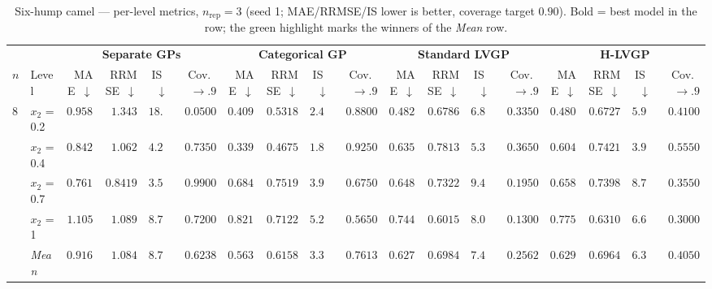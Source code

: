 \begin{table}[htbp]
\centering
\scriptsize
\setlength{\tabcolsep}{2.5pt}
\setlength{\fboxsep}{1pt}
\caption{Six-hump camel --- per-level metrics, $n_{\mathrm{rep}}=3$ (seed 1; MAE/RRMSE/IS lower is better, coverage target $0.90$). Bold = best model in the row; the green highlight marks the winners of the \emph{Mean} row.}
\label{tab:sixhump_camel_nrep03}
\begin{tabular}{llrrrrrrrrrrrrrrrr}
\toprule
 & & \multicolumn{4}{c}{\textbf{Separate GPs}} & \multicolumn{4}{c}{\textbf{Categorical GP}} & \multicolumn{4}{c}{\textbf{Standard LVGP}} & \multicolumn{4}{c}{\textbf{H-LVGP}} \\
\cmidrule(lr){3-6} \cmidrule(lr){7-10} \cmidrule(lr){11-14} \cmidrule(lr){15-18}
$n$ & Level & MAE~$\downarrow$ & RRMSE~$\downarrow$ & IS~$\downarrow$ & Cov.~$\to.9$ & MAE~$\downarrow$ & RRMSE~$\downarrow$ & IS~$\downarrow$ & Cov.~$\to.9$ & MAE~$\downarrow$ & RRMSE~$\downarrow$ & IS~$\downarrow$ & Cov.~$\to.9$ & MAE~$\downarrow$ & RRMSE~$\downarrow$ & IS~$\downarrow$ & Cov.~$\to.9$ \\
\midrule
\multirow{5}{*}{8} & $x_2$ = 0.2 & $0.9587$ & $1.343$ & $18.44$ & $0.0500$ & {\boldmath$0.4097$} & {\boldmath$0.5318$} & {\boldmath$2.431$} & {\boldmath$0.8800$} & $0.4820$ & $0.6786$ & $6.894$ & $0.3350$ & $0.4803$ & $0.6727$ & $5.995$ & $0.4100$ \\
 & $x_2$ = 0.4 & $0.8420$ & $1.062$ & $4.225$ & $0.7350$ & {\boldmath$0.3398$} & {\boldmath$0.4675$} & {\boldmath$1.828$} & {\boldmath$0.9250$} & $0.6352$ & $0.7813$ & $5.313$ & $0.3650$ & $0.6042$ & $0.7421$ & $3.980$ & $0.5550$ \\
 & $x_2$ = 0.7 & $0.7615$ & $0.8419$ & {\boldmath$3.532$} & {\boldmath$0.9900$} & $0.6846$ & $0.7519$ & $3.976$ & $0.6750$ & {\boldmath$0.6485$} & {\boldmath$0.7322$} & $9.495$ & $0.1950$ & $0.6589$ & $0.7398$ & $8.700$ & $0.3550$ \\
 & $x_2$ = 1 & $1.105$ & $1.089$ & $8.776$ & {\boldmath$0.7200$} & $0.8212$ & $0.7122$ & {\boldmath$5.270$} & $0.5650$ & {\boldmath$0.7443$} & {\boldmath$0.6015$} & $8.065$ & $0.1300$ & $0.7754$ & $0.6310$ & $6.690$ & $0.3000$ \\
 & \textit{Mean} & $0.9168$ & $1.084$ & $8.743$ & $0.6238$ & \colorbox{green!20}{\boldmath$0.5638$} & \colorbox{green!20}{\boldmath$0.6158$} & \colorbox{green!20}{\boldmath$3.376$} & \colorbox{green!20}{\boldmath$0.7613$} & $0.6275$ & $0.6984$ & $7.442$ & $0.2562$ & $0.6297$ & $0.6964$ & $6.341$ & $0.4050$ \\
\midrule

\end{tabular}
\end{table}
